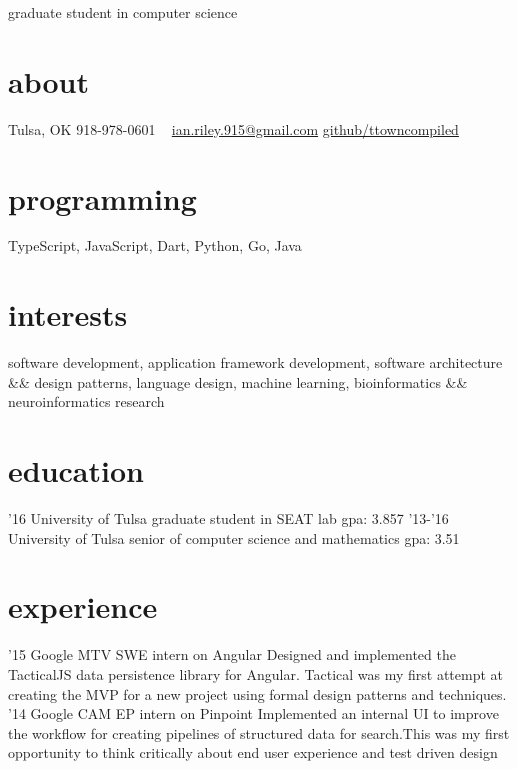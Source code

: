\documentclass[print]{friggeri-cv}
\begin{document}
       {graduate student in computer science}


\begin{aside}
  \section{about}
    Tulsa, OK
    918-978-0601
    ~
    \href{mailto:ian.riley.915@gmail.com}{ian.riley.915@gmail.com}
    \href{https://github.com/ttowncompiled}{github/ttowncompiled}
  \section{programming}
    TypeScript, JavaScript, Dart, Python, Go, Java
\end{aside}

\section{interests}
software development, application framework development, software architecture \&\& design patterns, language design, machine learning, bioinformatics \&\& neuroinformatics research

\section{education}

\begin{entrylist}
  \entry
    {'16}
    {University of Tulsa}
    {graduate student in SEAT lab}
    {gpa: 3.857}
  \entry
    {'13-'16}
    {University of Tulsa}
    {senior of computer science and mathematics}
    {gpa: 3.51}
\end{entrylist}

\section{experience}

\begin{entrylist}
  \entry
    {'15}
    {Google MTV}
    {SWE intern on Angular}
    {Designed and implemented the TacticalJS data persistence library for Angular. Tactical was my first attempt at creating the MVP for a new project using formal design patterns and techniques.}
  \entry
    {'14}
    {Google CAM}
    {EP intern on Pinpoint}
    {Implemented an internal UI to improve the workflow for creating pipelines of structured data for search.This was my first opportunity to think critically about end user experience and test driven design}
\end{entrylist}
\end{document}
